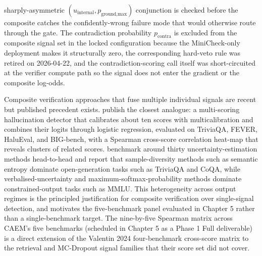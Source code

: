 sharply-asymmetric $(u_{\text{internal}}, p_{\text{ground,max}})$ conjunction is checked before the composite catches the confidently-wrong failure mode that would otherwise route through the gate. The contradiction probability $p_{\text{contra}}$ is excluded from the composite signal set in the locked configuration because the MiniCheck-only deployment makes it structurally zero, the corresponding hard-veto rule was retired on 2026-04-22, and the contradiction-scoring call itself was short-circuited at the verifier compute path so the signal does not enter the gradient or the composite log-odds.

Composite verification approaches that fuse multiple individual signals are recent but published precedent exists. \cite{valentin2024hallucination} publish the closest analogue: a multi-scoring hallucination detector that calibrates about ten scores with multicalibration and combines their logits through logistic regression, evaluated on TriviaQA, FEVER, HaluEval, and BIG-bench, with a Spearman cross-score correlation heat-map that reveals clusters of related scores. \cite{vashurin2024polygraph} benchmark around thirty uncertainty-estimation methods head-to-head and report that sample-diversity methods such as semantic entropy dominate open-generation tasks such as TriviaQA and CoQA, while verbalised-uncertainty and maximum-softmax-probability methods dominate constrained-output tasks such as MMLU. This heterogeneity across output regimes is the principled justification for composite verification over single-signal detection, and motivates the five-benchmark panel evaluated in Chapter 5 rather than a single-benchmark target. The nine-by-five Spearman matrix across CAEM's five benchmarks (scheduled in Chapter 5 as a Phase 1 Full deliverable) is a direct extension of the Valentin 2024 four-benchmark cross-score matrix to the retrieval and MC-Dropout signal families that their score set did not cover.

